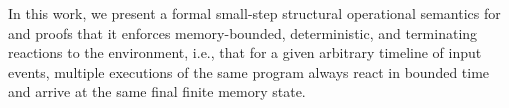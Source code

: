 In this work, we present a formal small-step structural operational semantics
for \CEU and proofs that it enforces memory-bounded, deterministic, and
terminating reactions to the environment, i.e., that for a given arbitrary
timeline of input events, multiple executions of the same program always react
in bounded time and arrive at the same final finite memory state.

